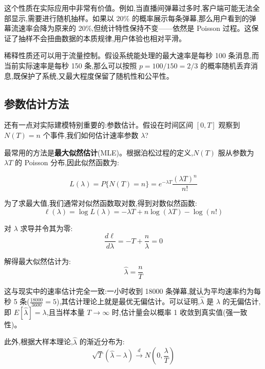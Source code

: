 \documentclass[12pt,a4paper]{article}
\begin{document}
这个性质在实际应用中非常有价值。例如,当直播间弹幕过多时,客户端可能无法全部显示,需要进行随机抽样。如果以 20\% 的概率展示每条弹幕,那么用户看到的弹幕流速率会降为原来的 20\%,但统计特性保持不变——依然是 Poisson 过程。这保证了抽样不会扭曲数据的本质规律,用户体验也相对平滑。

稀释性质还可以用于流量控制。假设系统能处理的最大速率是每秒 100 条消息,而当前实际速率是每秒 150 条,那么可以按照 $p = 100/150 = 2/3$ 的概率随机丢弃消息,既保护了系统,又最大程度保留了随机性和公平性。

\subsection{参数估计方法}

还有一点对实际建模特别重要的:参数估计。假设在时间区间 $[0,T]$ 观察到 $N(T)=n$ 个事件,我们如何估计速率参数 $\lambda$?

最常用的方法是\textbf{最大似然估计}(MLE)。根据泊松过程的定义,$N(T)$ 服从参数为 $\lambda T$ 的 Poisson 分布,因此似然函数为:

\begin{equation}
L(\lambda) = P\{N(T) = n\} = e^{-\lambda T} \frac{(\lambda T)^n}{n!}
\end{equation}

为了求最大值,我们通常对似然函数取对数,得到对数似然函数:
\begin{equation}
\ell(\lambda) = \log L(\lambda) = -\lambda T + n\log(\lambda T) - \log(n!)
\end{equation}

对 $\lambda$ 求导并令其为零:
\begin{equation}
\frac{d\ell}{d\lambda} = -T + \frac{n}{\lambda} = 0
\end{equation}

解得最大似然估计为:
\begin{equation}
\hat{\lambda} = \frac{n}{T}
\end{equation}

这与现实中的速率估计完全一致:一小时收到 18000 条弹幕,就认为平均速率约为每秒 5 条($\frac{18000}{3600} = 5$),其估计理论上就是最优无偏估计。可以证明,$\hat{\lambda}$ 是 $\lambda$ 的无偏估计,即 $E[\hat{\lambda}] = \lambda$,且当样本量 $T \to \infty$ 时,估计量会以概率 1 收敛到真实值(强一致性)。

此外,根据大样本理论,$\hat{\lambda}$ 的渐近分布为:
\begin{equation}
\sqrt{T}(\hat{\lambda} - \lambda) \xrightarrow{d} N\left(0, \frac{\lambda}{T}\right)
\end{equation}
\end{document}
